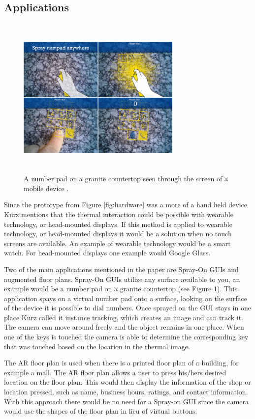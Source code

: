 \documentclass{sig-alternate}
\begin{document}
\subsection{Applications}
\label{Applications}

\begin{figure}
	\includegraphics[width=8cm, height=8cm]{numpad}
	\caption{A number pad on a granite countertop seen through the screen of a mobile device \cite{Thermal}.}
	\label{fig:numpad}
\end{figure}

Since the prototype from Figure \ref{fig:hardware} was a more of a hand held device Kurz mentions that the thermal interaction could be possible with wearable technology, or head-mounted displays. If this method is applied to wearable technology, or head-mounted displays it would be a solution when no touch screens are available. An example of wearable technology would be a smart watch. For head-mounted displays one example would Google Glass.    

Two of the main applications mentioned in the paper are Spray-On GUIs and augmented floor plans. Spray-On GUIs utilize any surface available to you, an example would be a number pad on a granite countertop (see Figure \ref{fig:numpad}). This application spays on a virtual number pad onto a surface, looking on the surface of the device it is possible to dial numbers. Once sprayed on the GUI stays in one place Kurz called it instance tracking, which creates an image and can track it. The camera can move around freely and the object remains in one place. When one of the keys is touched the camera is able to determine the corresponding key that was touched based on the location in the thermal image. 

The AR floor plan is used when there is a printed floor plan of a building, for example a mall. The AR floor plan allows a user to press his/hers desired location on the floor plan. This would then display the information of the shop or location pressed, such as name, business hours, ratings, and contact information. With this approach there would be no need for a Spray-on GUI since the camera would use the shapes of the floor plan in lieu of virtual buttons.          
\end{document}

